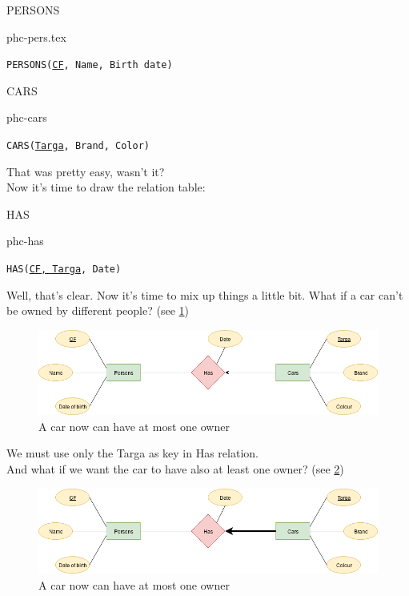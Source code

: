 \documentclass[class=book, crop=false, oneside]{standalone}
\begin{document}
\begin{minipage}{0.45\textwidth}
	PERSONS
	\begin{table}[H]
		\centering
		{phc-pers.tex}
	\end{table}
	\texttt{PERSONS(\underline{CF}, Name, Birth date)}
\end{minipage}
\hspace{.1\textwidth}
\begin{minipage}{.45\textwidth}
	CARS
	\begin{table}[H]
		\centering
		{phc-cars}
	\end{table}
	\texttt{CARS(\underline{Targa}, Brand, Color)}
\end{minipage}
\vskip 20pt
That was pretty easy, wasn't it?\\
Now it's time to draw the relation table:
\vskip 20pt
\begin{minipage}{.7\textwidth}
	HAS
	\begin{table}[H]
		{phc-has}
	\end{table}
	\texttt{HAS(\underline{CF, Targa}, Date)}
\end{minipage}
\vskip 20pt
Well, that's clear. Now it's time to mix up things a little bit.
What if a car can't be owned by different people? (see \ref{diagram1.01})
\begin{figure}[H]
	\centering
	\includegraphics[width=.9\textwidth,keepaspectratio]{diagram1_01.png}
	\caption{A car now can have at most one owner}
	\label{diagram1.01}
\end{figure}
We must use only the Targa as key in Has relation.
\\
And what if we want the car to have also at least one owner? (see \ref{diagram1_02})
\begin{figure}[H]
	\centering
	\includegraphics[width=.9\textwidth,keepaspectratio]{diagram1_02.png}
	\caption{A car now can have at most one owner}
	\label{diagram1_02}
\end{figure}
\end{document}
